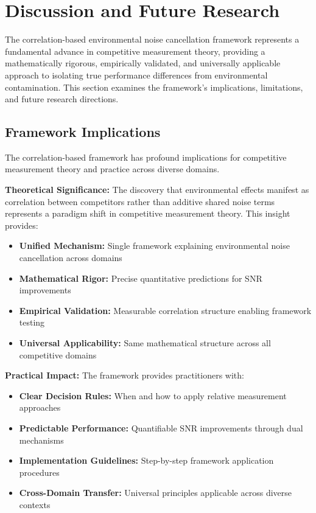 \section{Discussion and Future Research}

The correlation-based environmental noise cancellation framework represents a fundamental advance in competitive measurement theory, providing a mathematically rigorous, empirically validated, and universally applicable approach to isolating true performance differences from environmental contamination. This section examines the framework's implications, limitations, and future research directions.

\subsection{Framework Implications}

The correlation-based framework has profound implications for competitive measurement theory and practice across diverse domains.

\textbf{Theoretical Significance:}
The discovery that environmental effects manifest as correlation between competitors rather than additive shared noise terms represents a paradigm shift in competitive measurement theory. This insight provides:
\begin{itemize}
    \item \textbf{Unified Mechanism:} Single framework explaining environmental noise cancellation across domains
    \item \textbf{Mathematical Rigor:} Precise quantitative predictions for SNR improvements
    \item \textbf{Empirical Validation:} Measurable correlation structure enabling framework testing
    \item \textbf{Universal Applicability:} Same mathematical structure across all competitive domains
\end{itemize}

\textbf{Practical Impact:}
The framework provides practitioners with:
\begin{itemize}
    \item \textbf{Clear Decision Rules:} When and how to apply relative measurement approaches
    \item \textbf{Predictable Performance:} Quantifiable SNR improvements through dual mechanisms
    \item \textbf{Implementation Guidelines:} Step-by-step framework application procedures
    \item \textbf{Cross-Domain Transfer:} Universal principles applicable across diverse contexts
\end{itemize}

